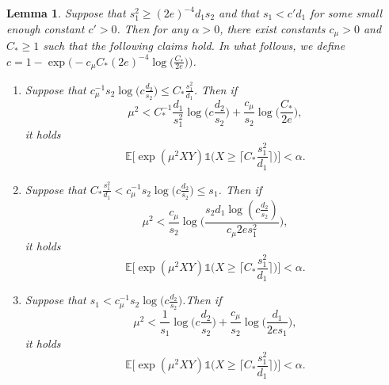 \documentclass{article}
\newcommand{\EE}{\mathbb{E}}
\newcommand{\one}{\mathds{1}}
\newcommand{\Ct}{C_{*}}
\newtheorem{lemma}{Lemma}
\theoremstyle{remark}
\begin{document}
\begin{lemma}\label{lem_lb_dense_allrates}
    Suppose that $s_1^2 \geq (2e)^{-4}d_1s_2$ and that $s_1 < c'd_1$ for some small enough constant $c'>0$.
    Then for any $\alpha > 0$, there exist constants $c_\mu > 0$ and $\Ct \geq 1$ such that the following claims hold. In what follows, we define $c = 1 - \exp\Big(-c_\mu \Ct (2e)^{-4}\log \Big(\frac{\Ct}{2e}\Big)\Big)$.
    \begin{enumerate}
        \item Suppose that $c_\mu^{-1}s_2\log\big(c\frac{d_2}{s_2}\big) \leq \Ct \frac{s_1^2}{d_1}$. Then if 
        \[\mu^2 < \Ct^{-1}\frac{d_1}{s_1^2}\log\Big(c \frac{d_2}{s_2}\Big) + \frac{c_\mu}{s_2}\log\Big(\frac{\Ct}{2e}\Big),\]
         it holds 
        \[\EE\Big[\exp(\mu^2XY)\one\big(X \geq \lceil  \Ct \frac{s_1^2}{d_1}\rceil\big)\Big] < \alpha.\]
        \item Suppose that $\Ct \frac{s_1^2}{d_1} < c_\mu^{-1}s_2\log\big(c\frac{d_2}{s_2}\big) \leq s_1$. Then if
        \[\mu^2 < \frac{c_\mu}{s_2}\log\Big(\frac{s_2d_1\log(c \frac{d_2}{s_2})}{c_\mu 2e s_1^2}\Big),\]
        it holds 
        \[\EE\Big[\exp(\mu^2XY)\one\big(X \geq \lceil  \Ct \frac{s_1^2}{d_1}\rceil\big)\Big] < \alpha.\]
        \item Suppose that $s_1 < c_\mu^{-1}s_2\log\big(c\frac{d_2}{s_2}\big)$.Then if
        \[\mu^2 < \frac{1}{s_1}\log\big(c \frac{d_2}{s_2}\big) + \frac{c_\mu}{s_2}\log\big(\frac{d_1}{2es_1}\big),\]
        it holds 
        \[\EE\Big[\exp(\mu^2XY)\one\big(X \geq \lceil  \Ct \frac{s_1^2}{d_1}\rceil\big)\Big] < \alpha.\]
    \end{enumerate}
\end{lemma}
\end{document}
